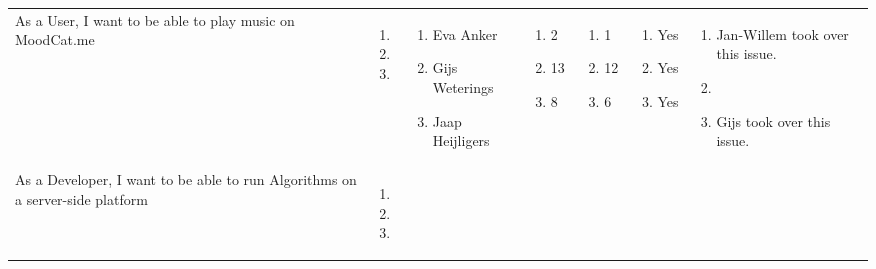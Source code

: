 \documentclass[11pt,a4paper]{article}
\begin{document}
\begin{table}[h]
\begin{tabular}{|p{4cm}|p{0.6cm}|p{2.0cm}|p{1.8cm}|p{1.8cm}|p{1.0cm}|p{5cm}}
As a User, I want to be able to play music on MoodCat.me & \begin{enumerate}[leftmargin=*,itemindent=0.1cm]
\item 
\item 
\item
\end{enumerate}

& 
\begin{enumerate}[leftmargin=*,itemindent=0.1cm]
\item[] Eva Anker
\item[] Gijs Weterings
\item[] Jaap Heijligers
\end{enumerate}

& 
\begin{enumerate}[leftmargin=*,itemindent=0.1cm]
\item[] 2 
\item[] 13 
\item[] 8 
\end{enumerate} 
 & \begin{enumerate}[leftmargin=*,itemindent=0.1cm]
\item[] 1 
\item[] 12 
\item[] 6 
\end{enumerate}

 & \begin{enumerate}[leftmargin=*,itemindent=0.1cm]
\item[] Yes
\item[] Yes
\item[] Yes
\end{enumerate}

 & \begin{enumerate}[leftmargin=*,itemindent=0.1cm]
\item[] Jan-Willem took over this issue.
\item[] 
\item[] Gijs took over this issue.
\end{enumerate}

\\

As a Developer, I want to be able to run Algorithms on a server-side platform & \begin{enumerate}[leftmargin=*,itemindent=0.1cm]
\item 
\item
\item 
\end{enumerate}


\end{tabular}
\end{table}
\end{document}
